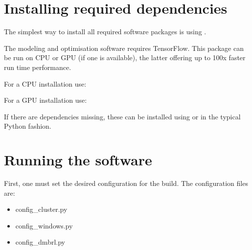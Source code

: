 \documentclass[letterpaper,10pt,english,openany,oneside]{sphinxmanual}
\begin{document}
\section{Installing required dependencies}
\label{\detokenize{installation:installing-required-dependencies}}
The simplest way to install all required software packages is using .

The modeling and optimisation software requires TensorFlow. This package can
be run on CPU or GPU (if one is available), the latter offering up to 100x faster
run time performance.

For a CPU installation use:

\begin{sphinxVerbatim}[commandchars=\\\{\}]
    
  
  
         
\end{sphinxVerbatim}

For a GPU installation use:

\begin{sphinxVerbatim}[commandchars=\\\{\}]
    
  
  
         
\end{sphinxVerbatim}

If there are dependencies missing, these can be installed using  or 
in the typical Python fashion.


\section{Running the software}
\label{\detokenize{installation:running-the-software}}
First, one must set the desired configuration for the build. The configuration files are:
\begin{itemize}
\item {} 
config\_cluster.py

\item {} 
config\_windows.py

\item {} 
config\_dmbrl.py

\end{itemize}
\end{document}
